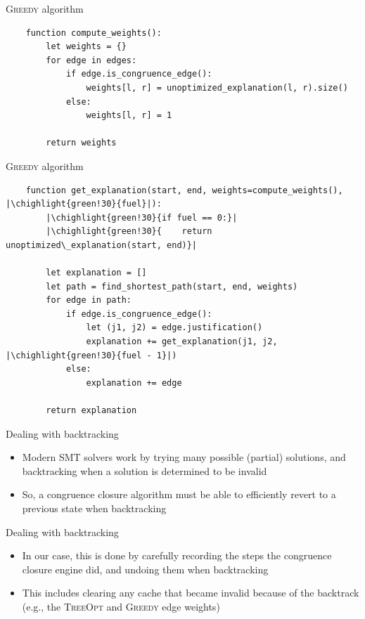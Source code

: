 \documentclass[aspectratio=169]{beamer}
\newcommand\vitem{\vfill\item}
\newcommand\chighlight[2]{\setlength{\fboxsep}{0pt}\colorbox{#1}{#2\strut}}
\begin{document}
\begin{frame}[fragile]{\textsc{Greedy} algorithm}
  \begin{verbatim}
    function compute_weights():
        let weights = {}
        for edge in edges:
            if edge.is_congruence_edge():
                weights[l, r] = unoptimized_explanation(l, r).size()
            else:
                weights[l, r] = 1

        return weights
  \end{verbatim}
\end{frame}

\begin{frame}[fragile]{\textsc{Greedy} algorithm}
  \begin{verbatim}
    function get_explanation(start, end, weights=compute_weights(), |\chighlight{green!30}{fuel}|):
        |\chighlight{green!30}{if fuel == 0:}|
        |\chighlight{green!30}{    return unoptimized\_explanation(start, end)}|

        let explanation = []
        let path = find_shortest_path(start, end, weights)
        for edge in path:
            if edge.is_congruence_edge():
                let (j1, j2) = edge.justification()
                explanation += get_explanation(j1, j2, |\chighlight{green!30}{fuel - 1}|)
            else:
                explanation += edge

        return explanation
  \end{verbatim}
\end{frame}

\begin{frame}{Dealing with backtracking}
  \begin{itemize}
    \item Modern SMT solvers work by trying many possible (partial) solutions,
    and backtracking when a solution is determined to be invalid
    \vitem So, a congruence closure algorithm must be able to efficiently revert
    to a previous state when backtracking
  \end{itemize}
\end{frame}

\begin{frame}{Dealing with backtracking}
  \begin{itemize}
    \item In our case, this is done by carefully recording the steps the
    congruence closure engine did, and undoing them when backtracking
    \vitem This includes clearing any cache that became invalid because of
    the backtrack (e.g., the \textsc{TreeOpt} and \textsc{Greedy} edge weights)
  \end{itemize}
\end{frame}
\end{document}
